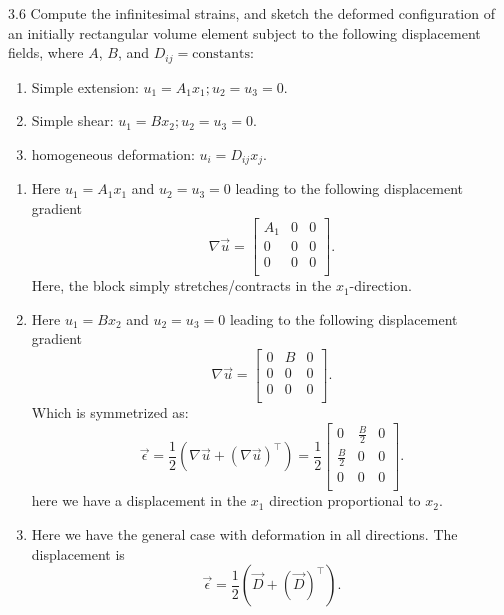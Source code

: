 \begin{problem}{3.6}
  Compute the infinitesimal strains, and sketch the deformed configuration of an initially rectangular volume element subject to the following displacement fields, where $A$, $B$, and $D_{ij} = \text{constants}$:
  \begin{enumerate}[label=(\alph*)]
    \item Simple extension: $u_1 = A_1 x_1; u_2 = u_3 = 0$.
    \item Simple shear: $u_1 = Bx_2; u_2 = u_3 = 0$.
    \item homogeneous deformation: $u_i = D_{ij} x_j$.
  \end{enumerate}
\end{problem}

\begin{derivation}
  \begin{enumerate}[label=(\alph*)]
    \item Here $u_1 = A_1 x_1$ and $u_2 = u_3 = 0$ leading to the following displacement gradient
      \begin{equation*}
        \nabla \Vec{u} = \begin{bmatrix}
          A_1 & 0 & 0\\
        0 & 0 & 0\\
        0 & 0 & 0\\
        \end{bmatrix}
      .\end{equation*}
      Here, the block simply stretches/contracts in the $x_1$-direction.
    \item Here $u_1 = B x_2$ and $u_2 = u_3 = 0$ leading to the following displacement gradient
      \begin{equation*}
        \nabla \Vec{u} = \begin{bmatrix}
          0 & B & 0\\
        0 & 0 & 0\\
        0 & 0 & 0\\
        \end{bmatrix}
      .\end{equation*}
      Which is symmetrized as:
      \begin{equation*}
        \Vec{\epsilon} = \frac{1}{2} \left( \nabla \Vec{u} + \left( \nabla \Vec{u} \right)^{\intercal} \right) = \frac{1}{2} \begin{bmatrix}
          0 & \frac{B}{2} & 0\\
        \frac{B}{2} & 0 & 0\\
        0 & 0 & 0\\
        \end{bmatrix}
      .\end{equation*}
      here we have a displacement in the $x_1$ direction proportional to $x_2$.
    \item Here we have the general case with deformation in all directions.
      The displacement is
      \begin{equation*}
        \Vec{\epsilon} = \frac{1}{2} \left( \Vec{D} + \left( \Vec{D} \right)^{\intercal} \right)
      .\end{equation*}
  \end{enumerate}
\end{derivation}

